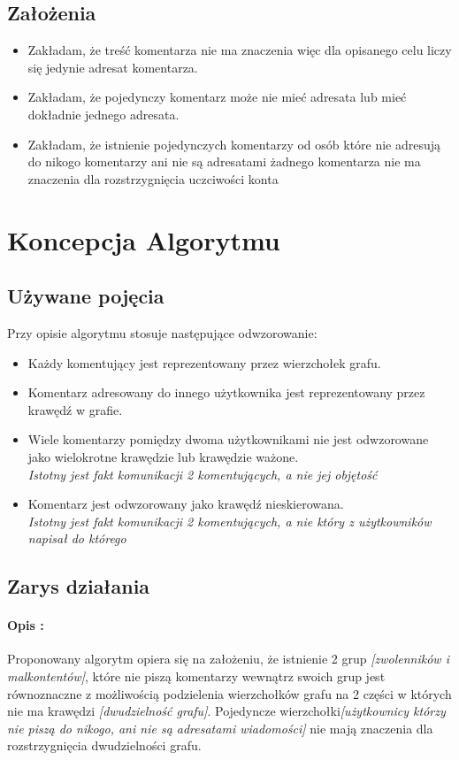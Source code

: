 \documentclass[11pt]{article}
\newcommand{\+}{\discretionary{\mbox{\scriptsize$\hookleftarrow$}}{}{}}
\begin{document}
\subsection{Założenia}
\begin{itemize}
\item
Zakładam, że treść komentarza nie ma znaczenia więc dla opisanego celu liczy się jedynie adresat komentarza.
\item
Zakładam, że pojedynczy komentarz może nie mieć adresata lub mieć dokładnie jednego adresata.
\item
Zakładam, że istnienie pojedynczych komentarzy od osób które nie adresują do nikogo komentarzy ani nie są adresatami żadnego komentarza nie ma znaczenia dla rozstrzygnięcia uczciwości konta
\end{itemize}

\section{Koncepcja Algorytmu}
\subsection{Używane pojęcia}
Przy opisie algorytmu stosuje następujące odwzorowanie:
\begin{itemize}
\item
Każdy komentujący jest reprezentowany przez wierzchołek grafu.
\item
Komentarz adresowany do innego użytkownika jest reprezentowany przez krawędź w grafie.
\item
Wiele komentarzy pomiędzy dwoma użytkownikami nie jest odwzorowane jako wielokrotne krawędzie lub krawędzie ważone.\\
 \textsl{Istotny jest fakt komunikacji 2 komentujących, a nie jej objętość}
\item
Komentarz jest odwzorowany jako krawędź nieskierowana. \\
\textsl{Istotny jest fakt komunikacji 2 komentujących, a nie który z użytkowników napisał do którego}
\end{itemize}
\subsection{Zarys działania}
\paragraph{Opis :\\}
   Proponowany algorytm opiera się na założeniu, że istnienie 2 grup \textsl{[zwolenników i malkontentów]}, które nie piszą komentarzy wewnątrz swoich grup jest równoznaczne z możliwością podzielenia wierzchołków grafu na 2 części w których nie ma krawędzi \textsl{[dwudzielność grafu]}. Pojedyncze wierzchołki\textsl{[użytkownicy którzy nie piszą do nikogo, ani nie są adresatami wiadomości]} nie mają znaczenia dla rozstrzygnięcia dwudzielności grafu.
\end{document}
